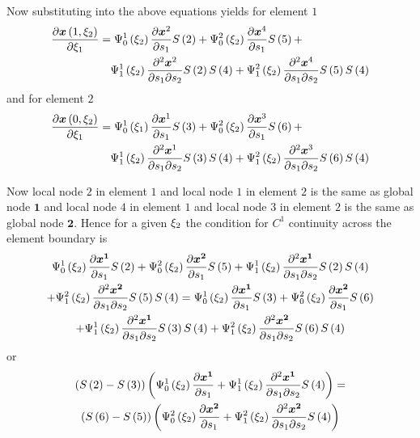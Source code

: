 Now substituting  into the
above equations yields for element $\mathit{1}$
\begin{equation}
  \begin{split}
    \delby{\fnof{\vect{x}}{1,\xitwo}}{\xione} &=
    \chbfn{0}{1}{\xitwo}\delby{\nodept{\vect{x}}{2}}{s_{1}}\esfone{2}+
    \chbfn{0}{2}{\xitwo}\delby{\nodept{\vect{x}}{4}}{s_{1}}\esfone{5}+ \\
    &\quad\chbfn{1}{1}{\xitwo}\deltwoby{\nodept{\vect{x}}{2}}{s_{1}}{s_{2}}
    \esfone{2}\esfone{4}+
    \chbfn{1}{2}{\xitwo}\deltwoby{\nodept{\vect{x}}{4}}{s_{1}}{s_{2}}
    \esfone{5}\esfone{4}
  \end{split}
\end{equation}
and for element $\mathit{2}$
\begin{equation}
  \begin{split}
    \delby{\fnof{\vect{x}}{0,\xitwo}}{\xione} &=
    \chbfn{0}{1}{\xione}\delby{\nodept{\vect{x}}{1}}{s_{1}}\esfone{3}+
    \chbfn{0}{2}{\xitwo}\delby{\nodept{\vect{x}}{3}}{s_{1}}\esfone{6}+ \\
    &\quad\chbfn{1}{1}{\xitwo}\deltwoby{\nodept{\vect{x}}{1}}{s_{1}}{s_{2}}
    \esfone{3}\esfone{4}+ 
    \chbfn{1}{2}{\xitwo}\deltwoby{\nodept{\vect{x}}{3}}{s_{1}}{s_{2}}
    \esfone{6}\esfone{4}
  \end{split}
\end{equation}

Now local node $2$ in element $\mathit{1}$ and local node $1$ in element
$\mathit{2}$ is the same as global node $\mathbf{1}$ and local node $4$ in
element $\mathit{1}$ and local node $3$ in element $\mathit{2}$ is the same as
global node $\mathbf{2}$. Hence for a given $\xi_{2}$ the condition for $C^{1}$
continuity across the element boundary is
\begin{multline}
  \chbfn{0}{1}{\xitwo}\delby{\nodept{\vect{x}}{\mathbf{1}}}{s_{1}}\esfone{2}+
  \chbfn{0}{2}{\xitwo}\delby{\nodept{\vect{x}}{\mathbf{2}}}{s_{1}}\esfone{5}+ 
  \chbfn{1}{1}{\xitwo}\deltwoby{\nodept{\vect{x}}{\mathbf{1}}}{s_{1}}{s_{2}}
  \esfone{2}\esfone{4} \\
  +\chbfn{1}{2}{\xitwo}\deltwoby{\nodept{\vect{x}}{\mathbf{2}}}{s_{1}}{s_{2}}
  \esfone{5}\esfone{4} = \chbfn{0}{1}{\xitwo}\delby{\nodept{\vect{x}}
    {\mathbf{1}}}{s_{1}}\esfone{3}+\chbfn{0}{2}{\xitwo}\delby{\nodept{\vect{x}}
    {\mathbf{2}}}{s_{1}}\esfone{6} \\
  +\chbfn{1}{1}{\xitwo}\deltwoby{\nodept{\vect{x}}{\mathbf{1}}}{s_{1}}{s_{2}}
  \esfone{3}\esfone{4}+\chbfn{1}{2}{\xitwo}\deltwoby{\nodept{\vect{x}}
    {\mathbf{2}}}{s_{1}}{s_{2}}\esfone{6}\esfone{4}
\end{multline}
or
\begin{multline}
  \pbrac{\esfone{2}-\esfone{3}}\pbrac{\chbfn{0}{1}{\xitwo}
    \delby{\nodept{\vect{x}}{\mathbf{1}}}{s_{1}}+\chbfn{1}{1}{\xitwo}
    \deltwoby{\nodept{\vect{x}}{\mathbf{1}}}{s_{1}}{s_{2}}\esfone{4}} = \\
  \pbrac{\esfone{6}-\esfone{5}}\pbrac{\chbfn{0}{2}{\xitwo}
    \delby{\nodept{\vect{x}}{\mathbf{2}}}{s_{1}}+\chbfn{1}{2}{\xitwo}
    \deltwoby{\nodept{\vect{x}}{\mathbf{2}}}{s_{1}}{s_{2}}\esfone{4}}
  \label{eqn:bchc1condition}
\end{multline}

